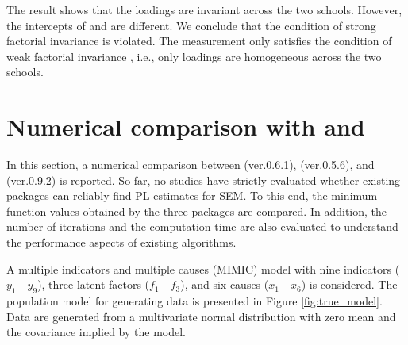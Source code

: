 \documentclass[nojss]{jss}
\begin{document}
The result shows that the loadings are invariant across the two schools. However, the intercepts of  and  are different. We conclude that the condition of strong factorial invariance is violated. The measurement only satisfies the condition of weak factorial invariance \citep{Meredith1993}, i.e., only loadings are homogeneous across the two schools.



\section[Numerical comparison with lsl and regsem]{Numerical comparison with  and } \label{sec:comparison}
In this section, a numerical comparison between  (ver.0.6.1),  (ver.0.5.6), and  (ver.0.9.2) is reported. So far, no studies have strictly evaluated whether existing packages can reliably find PL estimates for SEM. To this end, the minimum function values obtained by the three packages are compared. In addition, the number of iterations and the computation time are also evaluated to understand the performance aspects of existing algorithms.

A multiple indicators and multiple causes (MIMIC) model \citep{Joreskog1975} with nine indicators ($y_1$ - $y_9$), three latent factors ($f_1$ - $f_3$), and six causes ($x_1$ - $x_6$) is considered. The population model for generating data is presented in Figure \ref{fig:true_model}. Data are generated from a multivariate normal distribution with zero mean and the covariance implied by the model.
\end{document}
